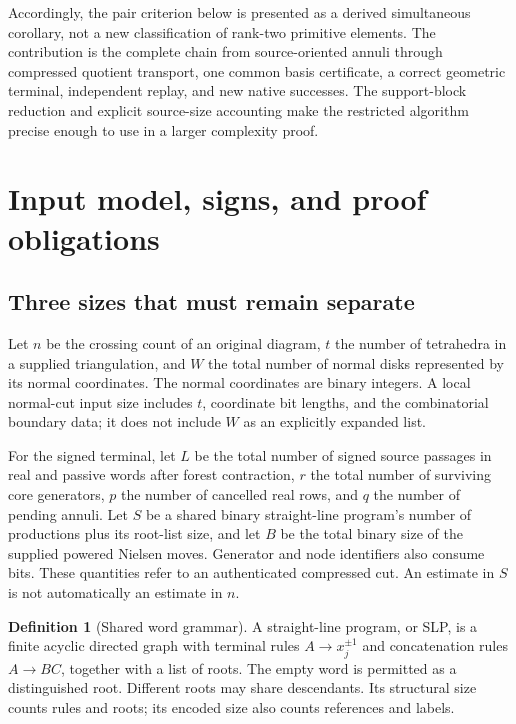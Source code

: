 \documentclass[11pt,a4paper]{article}
\theoremstyle{definition}
\newtheorem{definition}[theorem]{Definition}
\theoremstyle{remark}
\begin{document}
Accordingly, the pair criterion below is presented as a derived simultaneous
corollary, not a new classification of rank-two primitive elements. The
contribution is the complete chain from source-oriented annuli through
compressed quotient transport, one common basis certificate, a correct
geometric terminal, independent replay, and new native successes. The
support-block reduction and explicit source-size accounting make the
restricted algorithm precise enough to use in a larger complexity proof.

\section{Input model, signs, and proof obligations}
\label{sec:input}

\subsection{Three sizes that must remain separate}

Let $n$ be the crossing count of an original diagram, $t$ the number of
tetrahedra in a supplied triangulation, and $W$ the total number of normal
disks represented by its normal coordinates. The normal coordinates are
binary integers. A local normal-cut input size includes $t$, coordinate
bit lengths, and the combinatorial boundary data; it does not include $W$
as an explicitly expanded list.

For the signed terminal, let $L$ be the total number of signed source
passages in real and passive words after forest contraction, $r$ the total
number of surviving core generators, $p$ the number of cancelled real
rows, and $q$ the number of pending annuli. Let $S$ be a shared binary
straight-line program's number of productions plus its root-list size, and let $B$ be the total
binary size of the supplied powered Nielsen moves. Generator and node
identifiers also consume bits. These quantities refer to an authenticated
compressed cut. An estimate in $S$ is not automatically an estimate in $n$.

\begin{definition}[Shared word grammar]
A straight-line program, or SLP, is a finite acyclic directed graph with
terminal rules $A\to x_j^{\pm1}$ and concatenation rules $A\to BC$,
together with a list of roots. The empty word is permitted as a distinguished
root. Different roots may share descendants. Its structural size counts
rules and roots; its encoded size also counts references and labels.
\end{definition}
\end{document}
